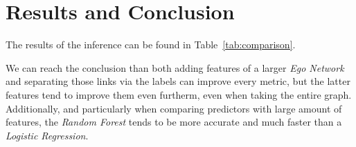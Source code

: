 \section{Results and Conclusion}


The results of the inference can be found in Table~\ref{tab:comparison}.

We can reach the conclusion than both adding features of a larger \emph{Ego Network} and separating those links via the labels can improve every metric, but the latter features tend to improve them even furtherm, even when taking the entire graph. Additionally, and particularly when comparing predictors with large amount of features, the \emph{Random Forest} tends to be more accurate and much faster than a \emph{Logistic Regression}.

